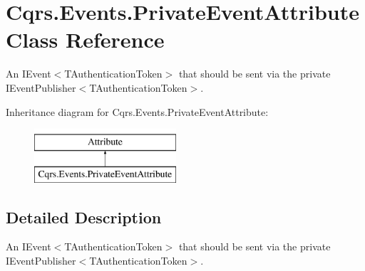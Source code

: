 \hypertarget{classCqrs_1_1Events_1_1PrivateEventAttribute}{}\section{Cqrs.\+Events.\+Private\+Event\+Attribute Class Reference}
\label{classCqrs_1_1Events_1_1PrivateEventAttribute}


An I\+Event$<$\+T\+Authentication\+Token$>$ that should be sent via the private I\+Event\+Publisher$<$\+T\+Authentication\+Token$>$.  


Inheritance diagram for Cqrs.\+Events.\+Private\+Event\+Attribute\+:\begin{figure}[H]
\begin{center}
\leavevmode
\includegraphics[height=2.000000cm]{classCqrs_1_1Events_1_1PrivateEventAttribute}
\end{center}
\end{figure}


\subsection{Detailed Description}
An I\+Event$<$\+T\+Authentication\+Token$>$ that should be sent via the private I\+Event\+Publisher$<$\+T\+Authentication\+Token$>$. 

